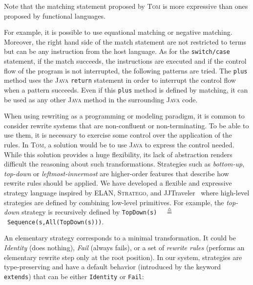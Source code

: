 \documentclass[runningheads]{llncs}
\newcommand{\stratego}{\textsc{Stratego}}
\newcommand{\jjtraveler}{{JJTraveler}}
\newcommand{\elan}    {\textsf{ELAN}\xspace}
\newcommand{\tom}{\textsc{Tom}}
\newcommand{\java}{\textsc{Java}}
\newcommand{\isdef}{\mathrel{\mbox{\small$\stackrel{\mbox{\tiny$\triangle$}}{=}$}}}
\begin{document}
Note that the matching statement proposed by {\tom} is more expressive than
ones proposed by functional languages. 

For example,  it is possible to use
equational matching or negative matching. Moreover, the right hand side of the
match statement are not restricted to terms but can be any instruction from the
host language. As for the \texttt{switch/case} statement, if the match
succeeds, the instructions are executed and if the control flow of the program
is not interrupted, the following patterns are tried. The \texttt{plus} method
uses the {\java} \texttt{return} statement in order to interrupt the
control flow when a pattern succeeds. Even if this \texttt{plus} method is
defined by matching, it can be used as any other {\java} method in the
surrounding {\java} code.

When using rewriting as a programming or modeling paradigm, it is common to
consider rewrite systems that are non-confluent or non-terminating. To be able
to use them, it is necessary to exercise some control over the application of
the rules. In {\tom}, a solution would be to use {\java} to express the control
needed. While this solution provides a huge flexibility, its lack of
abstraction renders difficult the reasoning about such transformations.
Strategies such as \emph{bottom-up}, \emph{top-down} or \emph{leftmost-innermost}
are higher-order features that describe how rewrite rules should be applied.
We have developed a flexible and expressive strategy language inspired by
{\elan}, {\stratego}, and {\jjtraveler}~\cite{visser-oopsla01} where high-level
strategies are defined by combining low-level primitives. For example, the
\emph{top-down} strategy is recursively defined by
\texttt{TopDown(s)}~${\isdef}$~\texttt{Sequence(s,All(TopDown(s)))}.

An elementary strategy corresponds to a minimal transformation. It could be
\emph{Identity} (does nothing), \emph{Fail} (always fails), or a set of
\emph{rewrite rules} (performs an elementary rewrite step only at the root
position).  In our system, strategies are type-preserving and have a default
behavior (introduced by the keyword \texttt{extends}) that can be either
\texttt{Identity} or \texttt{Fail}:

\end{document}
